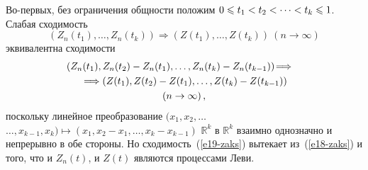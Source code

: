 \begin{multicols}{2}
Во-первых, без ограничения общности положим $0\hm\leqslant t_1\hm<t_2<\cdots <t_k
\hm\leqslant 1$. Слабая сходимость
$$
\left(Z_n(t_1),\ldots ,Z_n(t_k)\right)\Longrightarrow
\left(Z(t_1),\ldots ,Z(t_k)\right)\  (n\to\infty)
$$
эквивалентна сходимости
\begin{multline}
\hspace*{-10pt}\left(Z_n(t_1),Z_n(t_2)-Z_n(t_1),\ldots ,Z_n(t_k)-Z_n(t_{k-1})\right)\!
\Longrightarrow{}\hspace*{-2.87125pt}
\\
{}\Longrightarrow
\left(Z(t_1),Z(t_2)-Z(t_1),\ldots ,Z(t_k)-Z(t_{k-1})\right)\\
(n\to\infty)\,,\label{e19-zaks}
\end{multline}
поскольку линейное преобразование
$(x_1,x_2,\ldots$\linebreak $\ldots ,x_{k-1},x_k)\longmapsto (x_1,x_2-x_1,\ldots ,x_k-x_{k-1})$
$\mathbb{R}^k$ в $\mathbb{R}^k$ взаимно однозначно и непрерывно в
обе стороны. Но сходимость~(\ref{e19-zaks}) вытекает из~(\ref{e18-zaks}) и того, что и
$Z_n(t)$, и $Z(t)$ являются процессами Леви.


\end{multicols}
